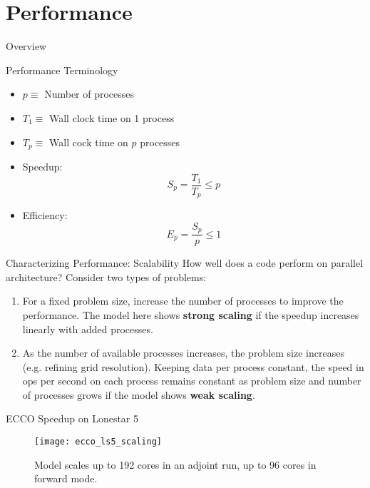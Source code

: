 \documentclass[pdf]{beamer}
\begin{document}
\section{Performance}
 \begin{frame}{Overview}
  \tableofcontents[currentsection]
 \end{frame}

 \begin{frame}{Performance Terminology}
  \begin{itemize}
	\item $p \equiv $ Number of processes
	\item $T_1 \equiv $ Wall clock time on 1 process
	\item $T_p \equiv $ Wall cock time on $p$ processes
	\item Speedup: 
	 \begin{equation}
		S_p = \frac{T_1}{T_p} \leq p
	 \end{equation}
	\item Efficiency: 
	 \begin{equation}
		E_p = \frac{S_p}{p} \leq 1
	 \end{equation}
  \end{itemize}
 \end{frame}

 \begin{frame}{Characterizing Performance: Scalability}
	How well does a code perform on parallel architecture? Consider two types of problems:
  \begin{enumerate}
	\item For a fixed problem size, increase the number of processes to improve the performance. The model here shows \textbf{strong scaling} if the speedup increases linearly with added processes. 
	\item As the number of available processes increases, the problem size increases (e.g. refining grid resolution). Keeping data per process constant, the speed in ops per second on each process remains constant as problem size and number of processes grows if the model shows \textbf{weak scaling}.
  \end{enumerate}
 \end{frame}

 \begin{frame}{ECCO Speedup on Lonestar 5}
	\begin{figure}
	\centering
	\texttt{[image: ecco\_ls5\_scaling]}
	\caption{Model scales up to 192 cores in an adjoint run, up to 96 cores in forward mode.}
	\end{figure}
 \end{frame}
\end{document}
